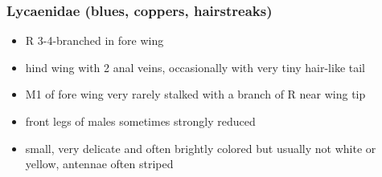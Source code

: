 \documentclass[letterpaper, 11pt]{article}
\begin{document}
\subsubsection{Lycaenidae (blues, coppers, hairstreaks)}
\begin{itemize}
\item R 3-4-branched in fore wing
\item hind wing with 2 anal veins, occasionally with very tiny hair-like tail
\item M1 of fore wing very rarely stalked with a branch of R near wing tip
\item front legs of males sometimes strongly reduced
\item small, very delicate and often brightly colored but usually not white or yellow, antennae often striped
\end{itemize}
\end{document}
